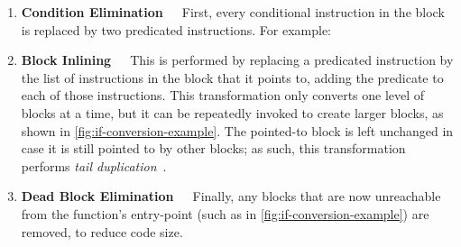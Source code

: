 \begin{enumerate}
\item\textbf{Condition Elimination}~~~First, every conditional instruction in the
block is replaced by two predicated  instructions. For example:
\begin{center}
\end{center}


\item\textbf{Block Inlining}~~~This is performed by replacing a predicated  instruction by the
list of instructions in the block that it points to, adding the
predicate to each of those instructions. This transformation only converts one level of blocks at a time, but it can be repeatedly invoked to create larger blocks, as shown in \cref{fig:if-conversion-example}. The pointed-to block is left unchanged in case it is still pointed to by other blocks; as such, this transformation performs \emph{tail duplication}~\cite{chang91_using_profil_infor_assis_class_code_optim}.

\item\textbf{Dead Block Elimination}~~~Finally, any blocks that are now unreachable from
the function's entry-point (such as  in \cref{fig:if-conversion-example}) are removed, to reduce code size.
\end{enumerate}


